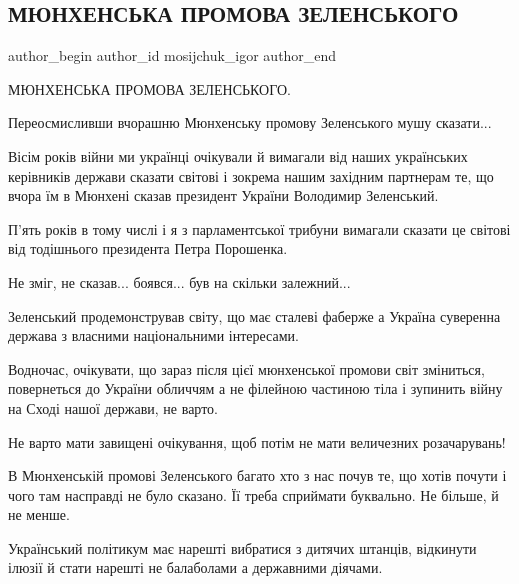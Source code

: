  
 
 
 
 
 
\subsection{МЮНХЕНСЬКА ПРОМОВА ЗЕЛЕНСЬКОГО}
\label{sec:20_02_2022.tg.mosijchuk_igor.1.mjunchen_promova_zelja}
 
\ifcmt
 author_begin
   author_id mosijchuk_igor
 author_end
\fi

МЮНХЕНСЬКА ПРОМОВА ЗЕЛЕНСЬКОГО.

Переосмисливши вчорашню Мюнхенську промову Зеленського мушу сказати...

Вісім років війни ми українці очікували й вимагали від наших українських
керівників держави сказати світові і зокрема нашим західним партнерам те, що
вчора їм в Мюнхені сказав президент України Володимир Зеленський. 

П’ять років в тому числі і я з парламентської трибуни вимагали сказати це
світові від тодішнього президента Петра Порошенка. 

Не зміг, не сказав... боявся... був на скільки залежний... 

Зеленський продемонстрував світу, що має сталеві фаберже а Україна суверенна
держава з власними національними інтересами. 

Водночас, очікувати, що зараз після цієї мюнхенської промови світ зміниться,
повернеться до України обличчям а не філейною частиною тіла і зупинить війну на
Сході нашої держави, не варто. 

Не варто мати завищені очікування, щоб потім не мати величезних розачарувань! 

В Мюнхенській промові Зеленського багато хто з нас почув те, що хотів почути і
чого там насправді не було сказано. Її треба сприймати буквально. Не більше, й
не менше. 

Український політикум має нарешті вибратися з дитячих штанців, відкинути ілюзії
й стати нарешті не балаболами а державними діячами. 

